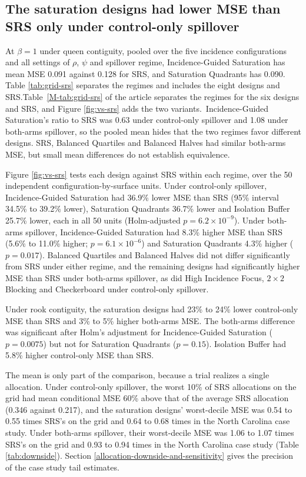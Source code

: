 \documentclass[11pt]{article}
\begin{document}
\subsection{The saturation designs had lower MSE than SRS only under control-only spillover}\label{srs-benchmark-and-allocation-specific-risk}


At \(\beta=1\) under queen contiguity, pooled over the five incidence
configurations and all settings of \(\rho\), \(\psi\) and spillover regime, Incidence-Guided Saturation has
mean MSE 0.091 against 0.128 for SRS, and Saturation Quadrants has 0.090. \iffullsi Table
\ref{tab:grid-srs} separates the regimes and includes the eight designs and SRS.\else Table~\ref{M-tab:grid-srs} of the article separates the regimes for the six designs and SRS, and Figure \ref{fig:vs-srs} adds the two variants.\fi\ Incidence-Guided Saturation's ratio to SRS was 0.63 under
control-only spillover and 1.08 under both-arms spillover, so the
pooled mean hides that the two regimes favor different designs.
SRS, Balanced Quartiles and Balanced Halves had similar both-arms MSE,
but small mean differences do not establish equivalence.

Figure \ref{fig:vs-srs} tests each design against SRS within each regime, over the 50 independent configuration-by-surface units. Under control-only spillover, Incidence-Guided Saturation had 36.9\% lower MSE than SRS (95\% interval 34.5\% to 39.2\% lower), Saturation Quadrants 36.7\% lower and Isolation Buffer 25.7\% lower, each in all 50 units (Holm-adjusted $p = 6.2\times10^{-9}$). Under both-arms spillover, Incidence-Guided Saturation had 8.3\% higher MSE than SRS (5.6\% to 11.0\% higher; $p = 6.1\times10^{-6}$) and Saturation Quadrants 4.3\% higher ($p = 0.017$). Balanced Quartiles and Balanced Halves did not differ significantly from SRS under either regime, and the remaining designs had significantly higher MSE than SRS under both-arms spillover, as did High Incidence Focus, $2\times2$ Blocking and Checkerboard under control-only spillover.

Under rook contiguity, the saturation designs had 23\% to 24\% lower control-only MSE than SRS and 3\% to 5\% higher both-arms MSE. The both-arms difference was significant after Holm's adjustment for Incidence-Guided Saturation ($p = 0.0075$) but not for Saturation Quadrants ($p = 0.15$). Isolation Buffer had 5.8\% higher control-only MSE than SRS.

\iffullsi
The mean is only part of the comparison, because a trial realizes a single allocation. Under control-only spillover, the worst 10\% of SRS allocations on the grid had mean conditional MSE 60\% above that of the average SRS allocation (0.346 against 0.217), and the saturation designs' worst-decile MSE was 0.54 to 0.55 times SRS's on the grid and 0.64 to 0.68 times in the North Carolina case study. Under both-arms spillover, their worst-decile MSE was 1.06 to 1.07 times SRS's on the grid and 0.93 to 0.94 times in the North Carolina case study (Table \ref{tab:downside}). Section \ref{allocation-downside-and-sensitivity} gives the precision of the case study tail estimates.
\fi
\end{document}
